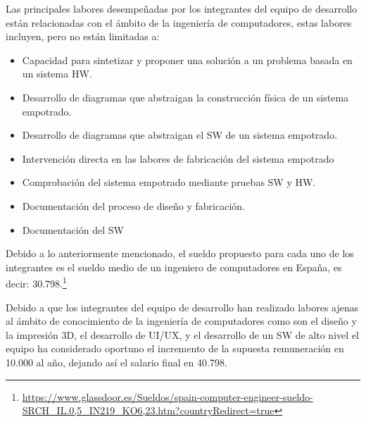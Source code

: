 Las principales labores desempeñadas por los integrantes del equipo de desarrollo están relacionadas con el ámbito de la ingeniería de computadores, estas labores incluyen, pero no están limitadas a:

\begin{itemize}
    \item Capacidad para sintetizar y proponer una solución a un problema basada en un sistema \ac{HW}.
    \item Desarrollo de diagramas que abstraigan la construcción física de un sistema empotrado.
    \item Desarrollo de diagramas que abstraigan el \ac{SW} de un sistema empotrado.
    \item Intervención directa en las labores de fabricación del sistema empotrado
    \item Comprobación del sistema empotrado mediante pruebas \ac{SW} y \ac{HW}.
    \item Documentación del proceso de diseño y fabricación.
    \item Documentación del \ac{SW}
\end{itemize}

Debido a lo anteriormente mencionado, el sueldo propuesto para cada uno de los integrantes es el sueldo medio de un ingeniero de computadores en España, es decir: 30.798.\footnote{\url{https://www.glassdoor.es/Sueldos/spain-computer-engineer-sueldo-SRCH_IL.0,5_IN219_KO6,23.htm?countryRedirect=true}}

Debido a que los integrantes del equipo de desarrollo han realizado labores ajenas al ámbito de conocimiento de la ingeniería de computadores como son el diseño y la impresión 3D, el desarrollo de UI/UX, y el desarrollo de un \ac{SW} de alto nivel el equipo ha considerado oportuno el incremento de la supuesta remuneración en 10.000\EUR{} al año, dejando así el salario final en 40.798.